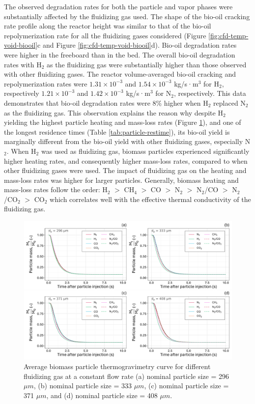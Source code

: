 The observed degradation rates for both the particle and vapor phases were substantially affected by the fluidizing gas used. The shape of the bio-oil cracking rate profile along the reactor height was similar to that of the bio-oil repolymerization rate for all the fluidizing gases considered (Figure \ref{fig:cfd-temp-void-biooil}c and Figure \ref{fig:cfd-temp-void-biooil}d). Bio-oil degradation rates were higher in the freeboard than in the bed. The overall bio-oil degradation rates with H$_2$ as the fluidizing gas were substantially higher than those observed with other fluidizing gases. The reactor volume-averaged bio-oil cracking and repolymerization rates were $1.31\times10^{-3}$ and $1.54\times10^{-3}$ kg/s·m$^3$ for H$_2$, respectively $1.21\times10^{-3}$ and $1.42\times10^{-3}$ kg/s·m$^3$ for N$_2$, respectively. This data demonstrates that bio-oil degradation rates were 8\% higher when H$_2$ replaced N$_2$ as the fluidizing gas. This observation explains the reason why despite H$_2$ yielding the highest particle heating and mass-loss rates (Figure \ref{fig:cfd-masspercent}), and one of the longest residence times (Table \ref{tab:particle-restime}), its bio-oil yield is marginally different from the bio-oil yield with other fluidizing gases, especially N$_2$. When H$_2$ was used as fluidizing gas, biomass particles experienced significantly higher heating rates, and consequently higher mass-loss rates, compared to when other fluidizing gases were used. The impact of fluidizing gas on the heating and mass-loss rates was higher for larger particles. Generally, biomass heating and mass-loss rates follow the order: H$_2$ $>$ CH$_4$ $>$ CO $>$ N$_2$ $>$ N$_2$/CO $>$ N$_2$/CO$_2$ $>$ CO$_2$ which correlates well with the effective thermal conductivity of the fluidizing gas.

\begin{figure}[H]
    \centering
    \includegraphics[width=1.0\textwidth]{figures/cfd-masspercent.pdf}
    \caption{Average biomass particle thermogravimetry curve for different fluidizing gas at a constant flow rate (a) nominal particle size = 296 $\mu m$, (b) nominal particle size = 333 $\mu m$, (c) nominal particle size = 371 $\mu m$, and (d) nominal particle size = 408 $\mu m$.}
    \label{fig:cfd-masspercent}
\end{figure}

